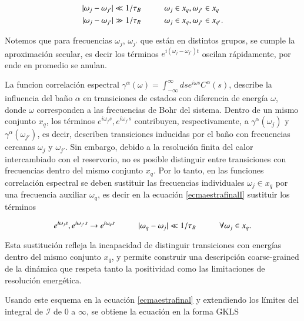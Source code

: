 \begin{align*}
    |\omega_{j}-\omega_{j'}| \ll 1/\tau_{B}  &\hspace{10mm} \omega_{j} \in x_{q}, \omega_{j'} \in x_{q} \\
    |\omega_{j}-\omega_{j'}| \gg 1/\tau_{R}  &\hspace{10mm} \omega_{j} \in x_{q}, \omega_{j'} \in x_{q'}.
\end{align*}

Notemos que para frecuencias $\omega_{j}$, $\omega_{j'}$ que están en distintos grupos, se cumple la aproximación secular, es decir los términos $e^{i(\omega_{j} - \omega_{j'})t}$ oscilan rápidamente, por ende en  promedio se anulan.

La funcion correlación  espectral $\gamma^{\alpha}(\omega) = \int_{-\infty}^{\infty} ds e^{i \omega s} C^{\alpha}(s)$, describe la influencia del baño $\alpha$ en transiciones de estados con diferencia de energía $\omega$, donde $\omega$ corresponden a las frecuencias de Bohr del sistema. Dentro de un mismo conjunto $x_{q}$, los términos $e^{i\omega_{j}s},e^{i\omega_{j'}s}$ contribuyen, respectivamente, a  $\gamma^{\alpha}(\omega_{j})$ y $\gamma^{\alpha}(\omega_{j'})$, es decir,  describen transiciones inducidas por el baño con frecuencias cercanas $\omega_{j}$ y $\omega_{j'}$. Sin embargo, debido a la resolución finita del calor intercambiado con el reservorio, no es posible distinguir entre transiciones con frecuencias dentro del mismo conjunto $x_q$. Por lo tanto, en las funciones correlación espectral se deben sustituir las frecuencias individuales $\omega_{j} \in x_{q}$ por una frecuencia auxiliar $\omega_{q}$, es decir en la ecuación \ref{ecmaestrafinalI} sustituir los términos  

\begin{equation*}
    e^{i\omega_{j}s},e^{i\omega_{j'}s} \to e^{i\omega_{q}s} \hspace{10mm} |\omega_{q} - \omega_{j}| \ll 1/\tau_{B} \hspace{10mm} \forall \omega_{j} \in x_{q}.
\end{equation*}

Esta sustitución refleja la incapacidad de distinguir transiciones con energías dentro del mismo conjunto \( x_q \), y permite construir una descripción coarse-grained de la dinámica que respeta tanto la positividad como las limitaciones de resolución energética\cite{chruscinski2017brief}. 

Usando este esquema en la ecuación \ref{ecmaestrafinal} y extendiendo los límites del integral de $\mathcal{I}$ de 0 a $\infty$, se obtiene la ecuación en la forma GKLS


